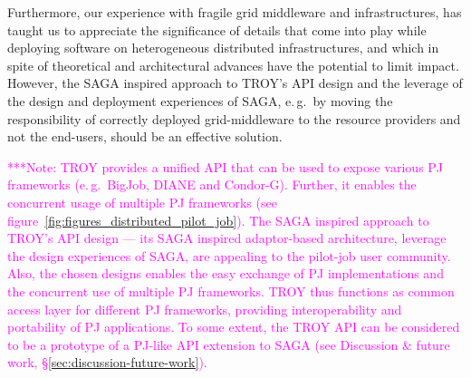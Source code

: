 \documentclass[conference,final]{IEEEtran}
\newcommand{\alnote}[1]{ {\textcolor{blue} { ***andre: #1 }}}
\newcommand{\note}[1]{ {\textcolor{magenta} { ***Note: #1 }}}
\newcommand{\alnote}[1]{}
\newcommand{\note}[1]{}
\begin{document}


Furthermore, our experience with fragile grid middleware and infrastructures,
has taught us to appreciate the significance of details that come into play
while deploying software on heterogeneous distributed infrastructures, and which
in spite of theoretical and architectural advances have the potential to limit
impact. However, the SAGA inspired approach to TROY's API design and the
leverage of the design and deployment experiences of SAGA, e.\,g.\ by moving the
responsibility of correctly deployed grid-middleware to the resource providers
and not the end-users, should be an effective solution.


\note{TROY provides a
  unified API that can be used to expose various PJ frameworks
  (e.\,g.\ BigJob, DIANE and Condor-G). Further, it enables the
  concurrent usage of multiple PJ frameworks (see
  figure~\ref{fig:figures_distributed_pilot_job}).  The SAGA inspired
  approach to TROY's API design --- its SAGA inspired adaptor-based
  architecture, leverage the design experiences of SAGA, are appealing
  to the pilot-job user community. Also, the chosen designs enables
  the easy exchange of PJ implementations and the concurrent use of
  multiple PJ frameworks. TROY thus functions as common access layer
  for different PJ frameworks, providing interoperability and
  portability of PJ applications. To some extent, the TROY API can be
  considered to be a prototype of a PJ-like API extension to SAGA (see
  Discussion \& future work, \S\ref{sec:discussion-future-work}).}
\end{document}
